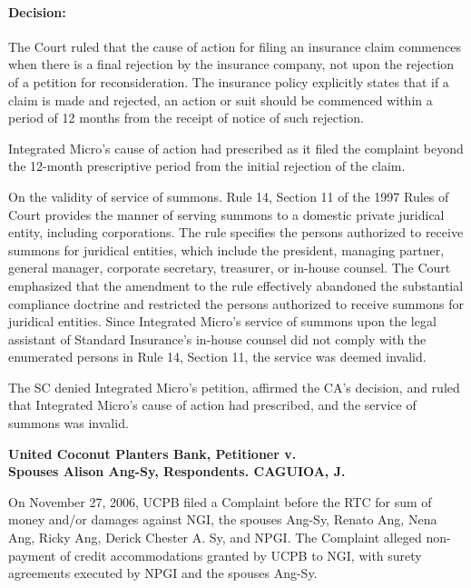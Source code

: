 \documentclass[
12pt,
oneside,
onehalfspacing,
headsepline
]{DigestCollection}
\begin{document}
\paragraph{Decision:}


The Court ruled that the cause of action for filing an insurance claim commences when there is a final rejection by the insurance company, not upon the rejection of a petition for reconsideration. The insurance policy explicitly states that if a claim is made and rejected, an action or suit should be commenced within a period of 12 months from the receipt of notice of such rejection. 

Integrated Micro's cause of action had prescribed as it filed the complaint beyond the 12-month prescriptive period from the initial rejection of the claim.

On the validity of service of summons. Rule 14, Section 11 of the 1997 Rules of Court provides the manner of serving summons to a domestic private juridical entity, including corporations. The rule specifies the persons authorized to receive summons for juridical entities, which include the president, managing partner, general manager, corporate secretary, treasurer, or in-house counsel. The Court emphasized that the amendment to the rule effectively abandoned the substantial compliance doctrine and restricted the persons authorized to receive summons for juridical entities. Since Integrated Micro's service of summons upon the legal assistant of Standard Insurance's in-house counsel did not comply with the enumerated persons in Rule 14, Section 11, the service was deemed invalid.

The SC denied Integrated Micro's petition, affirmed the CA's decision, and ruled that Integrated Micro's cause of action had prescribed, and the service of summons was invalid.



\noindent\textbf{United Coconut Planters Bank, Petitioner v. \\Spouses Alison Ang-Sy, Respondents. CAGUIOA, J.}\vspace{0.4cm}

On November 27, 2006, UCPB filed a Complaint before the RTC for sum of money and/or damages against NGI, the spouses Ang-Sy, Renato Ang, Nena Ang, Ricky Ang, Derick Chester A. Sy, and NPGI. The Complaint alleged non-payment of credit accommodations granted by UCPB to NGI, with surety agreements executed by NPGI and the spouses Ang-Sy.
\end{document}
